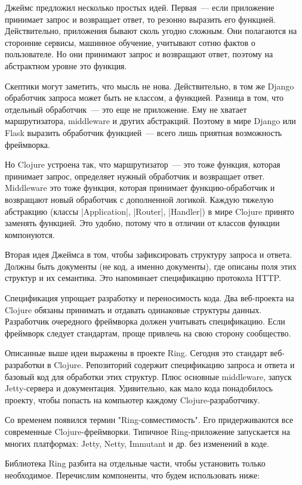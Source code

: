 Джеймс предложил несколько простых идей. Первая~--- если приложение принимает
запрос и возвращает ответ, то резонно выразить его функцией. Действительно,
приложения бывают сколь угодно сложным. Они полагаются на сторонние сервисы,
машинное обучение, учитывают сотню фактов о пользователе. Но они принимают
запрос и возвращают ответ, поэтому на абстрактном уровне это функция.

Скептики могут заметить, что мысль не нова. Действительно, в том же Django
обработчик запроса может быть не классом, а функцией. Разница в том, что
отдельный обработчик~--- это еще не приложение. Ему не хватает маршрутизатора,
middleware и других абстракций. Поэтому в мире Django или Flask выразить
обработчик функцией~--- всего лишь приятная возможность фреймворка.

Но Clojure устроена так, что маршрутизатор~--- это тоже функция, которая принимает
запрос, определяет нужный обработчик и возвращает ответ. Middleware это тоже
функция, которая принимает функцию-обработчик и возвращают новый обработчик с
дополненной логикой. Каждую тяжелую абстракцию (классы \spverb|Application|, \spverb|Router|,
\spverb|Handler|) в мире Clojure принято заменять функцией. Это удобно, потому что в
отличии от классов функции компонуются.

Вторая идея Джеймса в том, чтобы зафиксировать структуру запроса и
ответа. Должны быть документы (не код, а именно документы), где описаны поля
этих структур и их семантика. Это напоминает спецификацию протокола HTTP.

Спецификация упрощает разработку и переносимость кода. Два веб-проекта на
Clojure обязаны принимать и отдавать одинаковые структуры данных. Разработчик
очередного фреймворка должен учитывать спецификацию. Если фреймворк следует
стандартам, проще привлечь на свою сторону сообщество.

Описанные выше идеи выражены в проекте Ring. Сегодня это стандарт веб-разработки
в Clojure. Репозиторий содержит спецификацию запроса и ответа и базовый код для
обработки этих структур. Плюс основные middleware, запуск Jetty-сервера и
документация. Удивительно, как мало кода понадобилось проекту, чтобы попасть на
компьютер каждому Clojure-разработчику.

Со временем появился термин "Ring-совместимость". Его придерживаются все
современные Clojure-фреймворки. Типичное Ring-приложение запускается на многих
платформах: Jetty, Netty, Immutant и др. без изменений в коде.

Библиотека Ring разбита на отдельные части, чтобы установить только
необходимое. Перечислим компоненты, что будем использовать ниже:

